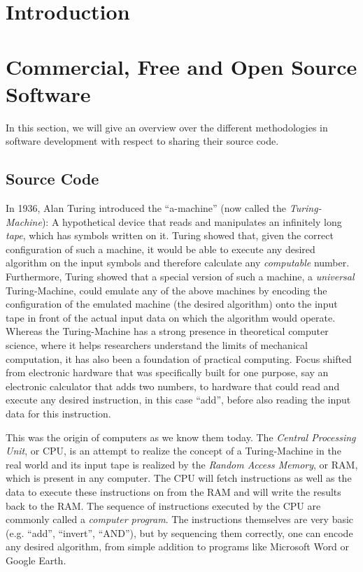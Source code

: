 \documentclass{article}
\begin{document}
\section{Introduction}

\section{Commercial, Free and Open Source Software}
In this section, we will give an overview over the different methodologies
in software development with respect to sharing their source code.
\subsection{Source Code}
In 1936, Alan Turing introduced the ``a-machine''
(now called the \emph{Turing-Machine}):
A hypothetical device that reads and manipulates an infinitely long
\emph{tape}, which has symbols written on it.
Turing showed that, given the correct configuration of such a machine,
it would be able to execute any desired algorithm on the input
symbols and therefore calculate any \emph{computable} number.
Furthermore, Turing showed that a special version of such a machine,
a \emph{universal} Turing-Machine, could emulate any of the above
machines by encoding the configuration of the emulated machine
(the desired algorithm) onto the input tape in front of the actual
input data on which the algorithm would operate. 
Whereas the Turing-Machine has a strong presence in theoretical
computer science, where it helps researchers understand the limits of
mechanical computation, it has also been a foundation of practical
computing. Focus shifted from electronic hardware that was
specifically built for one purpose, say an electronic calculator
that adds two numbers, to hardware that could read and execute any
desired instruction, in this case ``add'', before also reading the
input data for this instruction.

This was the origin of computers as we know them today.
The \emph{Central Processing Unit}, or CPU, is an attempt to realize the
concept of a Turing-Machine in the real world and its input tape is
realized by the \emph{Random Access Memory}, or RAM, which is present
in any computer. The CPU will fetch instructions as well as the data to
execute these instructions on from the RAM and will write the results
back to the RAM. The sequence of instructions executed by the CPU are
commonly called a \emph{computer program}. The instructions themselves
are very basic (e.g. ``add'', ``invert'', ``AND''), but by sequencing
them correctly, one can encode any desired algorithm, from simple
addition to programs like Microsoft Word or Google Earth.
\end{document}
